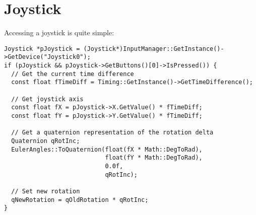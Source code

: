 \chapter{Joystick}
Accessing a joystick is quite simple:

\begin{lstlisting}[caption=Joystick usage example]
Joystick *pJoystick = (Joystick*)InputManager::GetInstance()->GetDevice("Joystick0");
if (pJoystick && pJoystick->GetButtons()[0]->IsPressed()) {
  // Get the current time difference
  const float fTimeDiff = Timing::GetInstance()->GetTimeDifference();

  // Get joystick axis
  const float fX = pJoystick->X.GetValue() * fTimeDiff;
  const float fY = pJoystick->Y.GetValue() * fTimeDiff;

  // Get a quaternion representation of the rotation delta
  Quaternion qRotInc;
  EulerAngles::ToQuaternion(float(fX * Math::DegToRad),
                            float(fY * Math::DegToRad),
                            0.0f,
                            qRotInc);

  // Set new rotation
  qNewRotation = qOldRotation * qRotInc;
}
\end{lstlisting}
